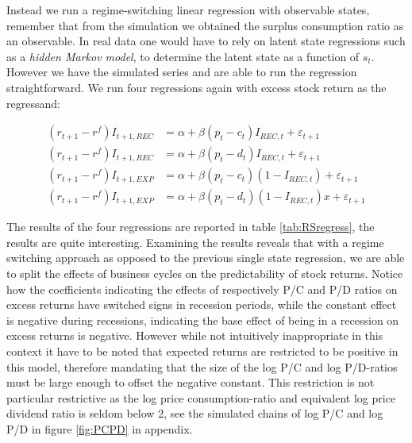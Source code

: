



Instead we run a regime-switching linear regression with observable states, remember that from the simulation we obtained the surplus consumption ratio as an observable. In real data one would have to rely on latent state regressions such as a \textit{hidden Markov model}, to determine the latent state as a function of $s_t$.\\
However we have the simulated series and are able to run the regression straightforward. We run four regressions again with excess stock return as the regressand:

\begin{align*}
    \left(r_{t+1} - r^{f}\right) I_{t+1,REC} &=  \alpha + \beta \left( p_t - c_t \right) I_{REC,t} + \varepsilon_{t+1}\\
    \left(r_{t+1} - r^{f}\right)I_{t+1,REC} &=  \alpha + \beta \left( p_t - d_t \right) I_{REC,t} + \varepsilon_{t+1}\\
    \left(r_{t+1} - r^{f}\right)I_{t+1,EXP} &=  \alpha + \beta \left( p_t - c_t \right) \left( 1- I_{REC,t}\right)  + \varepsilon_{t+1}\\
    \left(r_{t+1} - r^{f}\right)I_{t+1,EXP} &=  \alpha + \beta \left( p_t - d_t \right) \left( 1- I_{REC,t}\right) x+ \varepsilon_{t+1}
\end{align*}

The results of the four regressions are reported in table \ref{tab:RSregress}, the results are quite interesting. Examining the results reveals that with a regime switching approach as opposed to the previous single state regression, we are able to split the effects of business cycles on the predictability of stock returns. Notice how the coefficients indicating the effects of respectively P/C and P/D ratios on excess returns have switched signs in recession periods, while the constant effect is negative during recessions, indicating the base effect of being in a recession on excess returns is negative. However while not intuitively inappropriate in this context it have to be noted that expected returns are restricted to be positive in this model, therefore mandating that the size of the log P/C and log P/D-ratios must be large enough to offset the negative constant. This restriction is not particular restrictive as the log price consumption-ratio and equivalent log price dividend ratio is seldom below 2, see the simulated chains of log P/C and log P/D in figure \ref{fig:PCPD} in appendix.\\

